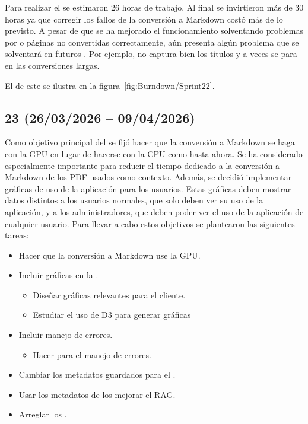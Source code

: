 Para realizar el  se estimaron 26 horas de trabajo. Al final se invirtieron más de 30 horas ya que corregir los fallos de la conversión a Markdown costó más de lo previsto. A pesar de que se ha mejorado el funcionamiento solventando problemas por  o páginas no convertidas correctamente, aún presenta algún problema que se solventará en futuros . Por ejemplo, no captura bien los títulos y a veces se para en las conversiones largas.

El  de este  se ilustra en la figura~\ref{fig:Burndown/Sprint22}.


\subsection{ 23 (26/03/2026 -- 09/04/2026)}
Como objetivo principal del  se fijó hacer que la conversión a Markdown se haga con la GPU en lugar de hacerse con la CPU como hasta ahora. Se ha considerado especialmente importante para reducir el tiempo dedicado a la conversión a Markdown de los PDF usados como contexto. Además, se decidió implementar gráficas de uso de la aplicación para los usuarios. Estas gráficas deben mostrar datos distintos a los usuarios normales, que solo deben ver su uso de la aplicación, y a los administradores, que deben poder ver el uso de la aplicación de cualquier usuario.  Para llevar a cabo estos objetivos se plantearon las siguientes tareas:

\begin{itemize}
	\tightlist
	\item Hacer que la conversión a Markdown use la GPU.
	\item Incluir gráficas en la .
	\begin{itemize}
	\tightlist
		\item Diseñar gráficas relevantes para el cliente.
		\item Estudiar el uso de D3 para generar gráficas
	\end{itemize}
	\item Incluir manejo de errores.
	\begin{itemize}
	\tightlist
		\item Hacer  para el manejo de errores.
	\end{itemize}
	\item Cambiar los metadatos guardados para el .
	\item Usar los metadatos de los  mejorar el RAG.
	\item Arreglar los .
\end{itemize}

